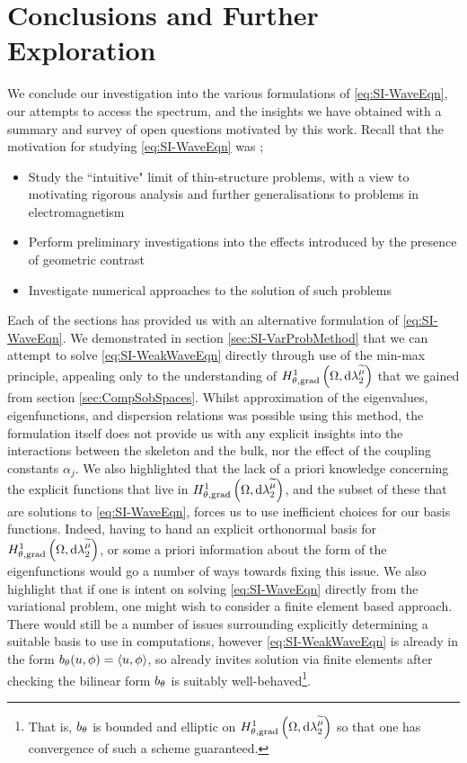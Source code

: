 \section{Conclusions and Further Exploration} \label{sec:SI-Conc}
We conclude our investigation into the various formulations of \eqref{eq:SI-WaveEqn}, our attempts to access the spectrum, and the insights we have obtained with a summary and survey of open questions motivated by this work.
Recall that the motivation for studying \eqref{eq:SI-WaveEqn} was ;
\begin{itemize}
	\item Study the ``intuitive" limit of thin-structure problems, with a view to motivating rigorous analysis and further generalisations to problems in electromagnetism
	\item Perform preliminary investigations into the effects introduced by the presence of geometric contrast
	\item Investigate numerical approaches to the solution of such problems
\end{itemize} 

Each of the sections  has provided us with an alternative formulation of \eqref{eq:SI-WaveEqn}.
We demonstrated in section \ref{sec:SI-VarProbMethod} that we can attempt to solve \eqref{eq:SI-WeakWaveEqn} directly through use of the min-max principle, appealing only to the understanding of $H^1_{\theta, \mathrm{grad}}\left( \Omega, \mathrm{d}\lambda_2^{\widetilde{\mu}} \right)$ that we gained from section \ref{sec:CompSobSpaces}.
Whilst approximation of the eigenvalues, eigenfunctions, and dispersion relations was possible using this method, the formulation itself does not provide us with any explicit insights into the interactions between the skeleton and the bulk, nor the effect of the coupling constants $\alpha_j$.
We also highlighted that the lack of a priori knowledge concerning the explicit functions that live in $H^1_{\theta, \mathrm{grad}}\left( \Omega, \mathrm{d}\lambda_2^{\widetilde{\mu}} \right)$, and the subset of these that are solutions to \eqref{eq:SI-WaveEqn}, forces us to use inefficient choices for our basis functions.
Indeed, having to hand an explicit orthonormal basis for $H^1_{\theta, \mathrm{grad}}\left( \Omega, \mathrm{d}\lambda_2^{\widetilde{\mu}} \right)$, or some a priori information about the form of the eigenfunctions would go a number of ways towards fixing this issue.
We also highlight that if one is intent on solving \eqref{eq:SI-WaveEqn} directly from the variational problem, one might wish to consider a finite element based approach.
There would still be a number of issues surrounding explicitly determining a suitable basis to use in computations, however \eqref{eq:SI-WeakWaveEqn} is already in the form $b_{\theta}(u,\phi)=\left\langle u , \phi \right\rangle$, so already invites solution via finite elements after checking the bilinear form $b_{\theta}$ is suitably well-behaved\footnote{That is, $b_{\theta}$ is bounded and elliptic on $H^1_{\theta, \mathrm{grad}}\left( \Omega, \mathrm{d}\lambda_2^{\widetilde{\mu}} \right)$ so that one has convergence of such a scheme guaranteed.}.

